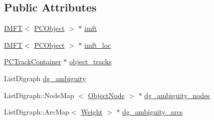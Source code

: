 \subsection*{\-Public \-Attributes}
\begin{DoxyCompactItemize}
\item 
\hyperlink{class_i_m_f_t}{\-I\-M\-F\-T}$<$ \hyperlink{class_p_c_object}{\-P\-C\-Object} $>$ $\ast$ \hyperlink{class_p_c_tracking_aeaa5bcbc69a1c426360f3e06aac7cef9}{imft}
\item 
\hyperlink{class_i_m_f_t}{\-I\-M\-F\-T}$<$ \hyperlink{class_p_c_object}{\-P\-C\-Object} $>$ $\ast$ \hyperlink{class_p_c_tracking_a08ee78ad7493830226491b49bf72e514}{imft\-\_\-loc}
\item 
\hyperlink{class_p_c_track_container}{\-P\-C\-Track\-Container} $\ast$ \hyperlink{class_p_c_tracking_af632efe77ea5fc04f6d6b7eea0d3bb55}{object\-\_\-tracks}
\item 
\-List\-Digraph \hyperlink{class_p_c_tracking_afd47ea4d5013475b7556ebbc2eacb8a4}{dg\-\_\-ambiguity}
\item 
\-List\-Digraph\-::\-Node\-Map\*
$<$ \hyperlink{struct_object_node}{\-Object\-Node} $>$ $\ast$ \hyperlink{class_p_c_tracking_ab0978d139653c88b54b8e0f214ec2e2e}{dg\-\_\-ambiguity\-\_\-nodes}
\item 
\-List\-Digraph\-::\-Arc\-Map$<$ \hyperlink{struct_weight}{\-Weight} $>$ $\ast$ \hyperlink{class_p_c_tracking_a58337c79f8c1bc741c17867147f90132}{dg\-\_\-ambiguity\-\_\-arcs}
\end{DoxyCompactItemize}
